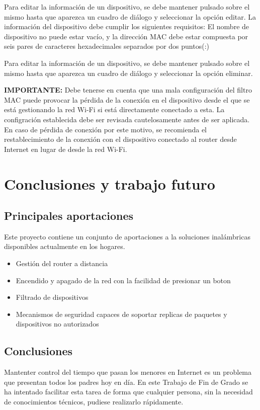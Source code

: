 \documentclass[12pt, twoside]{article}
\begin{document}
        Para editar la información de un dispositivo, se debe mantener pulsado sobre el mismo hasta que aparezca un cuadro de diálogo y seleccionar la opción editar. La información del dispositivo debe cumplir los siguientes requisitos: El nombre de dispositivo no puede estar vacío, y la dirección MAC debe estar compuesta por seis pares de caracteres hexadecimales separados por dos puntos(:)

        Para editar la información de un dispositivo, se debe mantener pulsado sobre el mismo hasta que aparezca un cuadro de diálogo y seleccionar la opción eliminar.

        \textbf{IMPORTANTE:} Debe tenerse en cuenta que una mala configuración del filtro MAC puede provocar la pérdida de la conexión en el dispositivo desde el que se está gestionando la red Wi-Fi si está directamente conectado a esta. La configración establecida debe ser revisada cautelosamente antes de ser aplicada. En caso de pérdida de conexión por este motivo, se recomienda el restablecimiento de la conexión con el dispositivo conectado al router desde Internet en lugar de desde la red Wi-Fi.

\cleardoublepage \section{Conclusiones y trabajo futuro} \label{sec:conc}
    \subsection{Principales aportaciones}
    Este proyecto contiene un conjunto de aportaciones a la soluciones inalámbricas disponibles actualmente en los hogares.
    
    \begin{itemize}
        \item Gestión del router a distancia
        \item Encendido y apagado de la red con la facilidad de presionar un boton
        \item Filtrado de dispositivos
        \item Mecanismos de seguridad capaces de soportar replicas de paquetes y dispositivos no autorizados
    \end{itemize}
    
    \subsection{Conclusiones}
    Mantenter control del tiempo que pasan los menores en Internet es un problema que presentan todos los padres hoy en día. En este Trabajo de Fin de Grado se ha intentado facilitar esta tarea de forma que cualquier persona, sin la necesidad de conocimientos técnicos, pudiese realizarlo rápidamente. 
    
\end{document}
